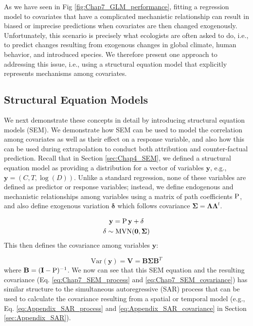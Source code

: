 As we have seen in Fig \ref{fig:Chap7_GLM_performance}, fitting a regression model to covariates that have a complicated mechanistic relationship can result in biased or imprecise predictions when covariates are then changed exogenously.  Unfortunately, this scenario is precisely what ecologists are often asked to do, i.e., to predict changes resulting from exogenous changes in global climate, human behavior, and introduced species.  We therefore present one approach to addressing this issue, i.e., using a structural equation model that explicitly represents mechanisms among covariates.

\subsection{Structural Equation Models} \label{sec:Chap7_strutural_equation_models}

We next demonstrate these concepts in detail by introducing structural equation models (SEM).  We demonstrate how SEM can be used to model the correlation among covariates as well as their effect on a response variable, and also how this can be used during extrapolation to conduct both attribution and counter-factual prediction.  Recall that in Section \ref{sec:Chap4_SEM}, we defined a structural equation model as providing a distribution for a vector of variables \( \mathbf{y} \), e.g., \( \mathbf{y} = (C, T, \log(D)) \).  Unlike a standard regression, none of these variables are defined as predictor or response variables;  instead, we define endogenous and mechanistic relationships among variables using a matrix of path coefficients \( \mathbf{\operatorname{P}} \), and also define exogenous variation \( \mathbf{\delta} \) which follows covariance \( \mathbf{\Sigma = \Lambda \Lambda}^t \).  

\begin{equation} \label{eq:Chap7_SEM_process}
\begin{gathered}
    \mathbf{y} = \mathbf{\Rho y} + \mathbf{\delta}  \\
    \mathbf{\delta} \sim \mathrm{MVN}(\mathbf{0},\mathbf{\Sigma})
\end{gathered}
\end{equation}
This then defines the covariance among variables \(\mathbf{y}\):

\begin{equation} \label{eq:Chap7_SEM_covariance}
    \mathrm{Var}(\mathbf{y}) = \mathbf{V} =  \mathbf{B} \mathbf{\Sigma} \mathbf{B}^T    
\end{equation}
where \( \mathbf{B} = (\mathbf{I-\operatorname{P}})^{-1} \).  We now can see that this SEM equation and the resulting covariance (Eq. \ref{eq:Chap7_SEM_process} and \ref{eq:Chap7_SEM_covariance}) has similar structure to the simultaneous autoregressive (SAR) process that can be used to calculate the covariance resulting from a spatial or temporal model (e.g., Eq. \ref{eq:Appendix_SAR_process} and \ref{eq:Appendix_SAR_covariance} in Section \ref{sec:Appendix_SAR}).  

